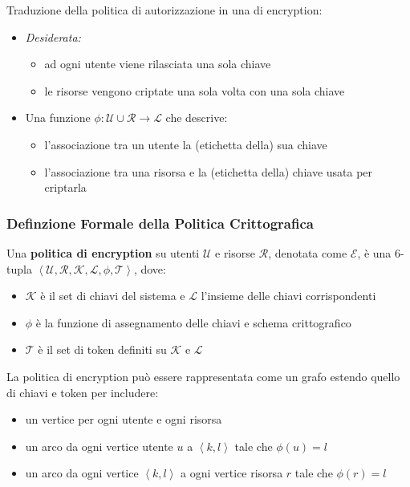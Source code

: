 \documentclass{report}
\begin{document}
\noindent Traduzione della politica di autorizzazione in una di encryption:
\begin{itemize}
    \item \textit{Desiderata:}
    \begin{itemize}
        \item ad ogni utente viene rilasciata una sola chiave 
        \item le risorse vengono criptate una sola volta con una sola chiave 
    \end{itemize}
    \item Una funzione $\phi : \mathcal{U} \cup \mathcal{R} \rightarrow \mathcal{L}$ che descrive:
    \begin{itemize}
        \item l'associazione tra un utente la (etichetta della) sua chiave
        \item l'associazione tra una risorsa e la (etichetta della) chiave usata per criptarla
    \end{itemize}
\end{itemize}

\subsubsection{Definzione Formale della Politica Crittografica}
Una \textbf{politica di encryption} su utenti $\mathcal{U}$ e risorse $\mathcal{R}$, denotata come $\mathcal{E}$,
è una 6-tupla $\left\langle \mathcal{U, R, K, L, \phi, T} \right\rangle$, dove:
\begin{itemize}
    \item $\mathcal{K}$ è il set di chiavi del sistema e $\mathcal{L}$ l'insieme delle chiavi corrispondenti
    \item $\phi$ è la funzione di assegnamento delle chiavi e schema crittografico 
    \item $\mathcal{T}$ è il set di token definiti su $\mathcal{K}$ e $\mathcal{L}$
\end{itemize}

\noindent La politica di encryption può essere rappresentata come un grafo estendo quello di chiavi 
e token per includere:
\begin{itemize}
    \item un vertice per ogni utente e ogni risorsa 
    \item un arco da ogni vertice utente $u$ a $\left\langle k, l \right\rangle$ tale che $\phi(u)=l$
    \item un arco da ogni vertice $\left\langle k, l \right\rangle$ a ogni vertice risorsa $r$ tale che $\phi(r)=l$
\end{itemize}
\end{document}
